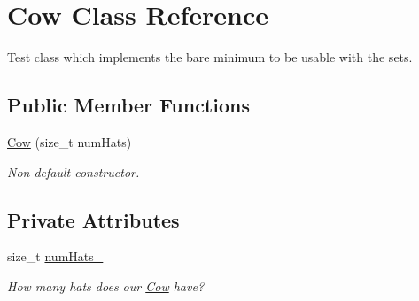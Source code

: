 \hypertarget{class_cow}{\section{Cow Class Reference}
\label{class_cow}
}


Test class which implements the bare minimum to be usable with the sets.  


\subsection*{Public Member Functions}
\begin{DoxyCompactItemize}
\item 
\hypertarget{class_cow_a7d60406c5ed4761cf6e71c329762255f}{\hyperlink{class_cow_a7d60406c5ed4761cf6e71c329762255f}{Cow} (size\-\_\-t num\-Hats)}\label{class_cow_a7d60406c5ed4761cf6e71c329762255f}

\begin{DoxyCompactList}\small\item\em Non-\/default constructor. \end{DoxyCompactList}\end{DoxyCompactItemize}
\subsection*{Private Attributes}
\begin{DoxyCompactItemize}
\item 
\hypertarget{class_cow_a29edbbdc2d256dcf105b718258bacce9}{size\-\_\-t \hyperlink{class_cow_a29edbbdc2d256dcf105b718258bacce9}{num\-Hats\-\_\-}}\label{class_cow_a29edbbdc2d256dcf105b718258bacce9}

\begin{DoxyCompactList}\small\item\em How many hats does our \hyperlink{class_cow}{Cow} have? \end{DoxyCompactList}\end{DoxyCompactItemize}
